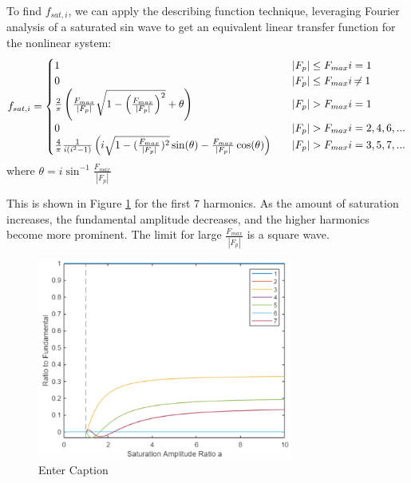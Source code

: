 \documentclass{ifacconf}
\begin{document}
To find $f_{sat,i}$, we can apply the describing function technique, leveraging Fourier analysis of a saturated sin wave to get an equivalent linear transfer function for the nonlinear system:
\begin{equation}\label{f-sat-desc-fcn}
    f_{sat,i} =
\begin{cases}
1 & \quad |F_p| \leq F_{max} \And i = 1\\
0 & \quad |F_p| \leq F_{max} \And i \neq 1 \\
\frac{2}{\pi} \left(\frac{F_{max}}{|F_p|}\sqrt{1 - \left(\frac{F_{max}}{|F_p|}\right)^2} + \theta \right) & \quad |F_p| > F_{max} \And i = 1 \\ 
0 & \quad |F_p| > F_{max} \And i = 2,4,6,... \\
\frac{4}{\pi} \frac{1}{i (i^2 - 1)} \left( i \sqrt{1 - (\frac{F_{max}}{|F_p|})^2}\sin(\theta) - \frac{F_{max}}{|F_p|}\cos(\theta) \right) & \quad |F_p| > F_{max} \And i = 3,5,7,...
\end{cases}
\end{equation}
where $\theta = i \sin^{-1}\frac{F_{max}}{|F_p|} $

This is shown in Figure \ref{fig:desc-fcn} for the first 7 harmonics. As the amount of saturation increases, the fundamental amplitude decreases, and the higher harmonics become more prominent. The limit for large $\frac{F_{max}}{|F_p|}$ is a square wave.

\begin{figure}
    \centering
    \includegraphics[width=8.4cm]{ifacconf_latex/saturation_harmonics.png}
    \caption{Enter Caption}
    \label{fig:desc-fcn}
\end{figure}
\end{document}
